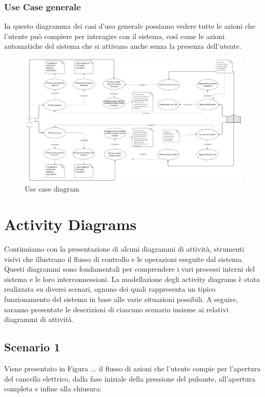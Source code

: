 \documentclass[12pt]{article}
\begin{document}
\newpage
\begin{landscape}
\subsubsection{Use Case generale}
In questo diagramma dei casi d'uso generale possiamo vedere tutte le azioni che l'utente può compiere per interagire con il sistema, così come le azioni automatiche del sistema che si attivano anche senza la presenza dell'utente.
\begin{figure}[H] %
    \centering %
    \includegraphics[width=1.4\textwidth]{usa_case_diagram.PNG} %
    \caption{Use case diagram} %
    \label{fig:General Use Case DIagram} %
\end{figure}
\end{landscape}

\newpage
\section{Activity Diagrams}
Continuiamo con la presentazione di alcuni diagrammi di attività, strumenti visivi che illustrano il flusso di controllo e le operazioni eseguite dal sistema. Questi diagrammi sono fondamentali per comprendere i vari processi interni del sistema e le loro interconnessioni.
La modellazione degli activity diagrams è stata realizzata su diversi scenari, ognuno dei quali rappresenta un tipico funzionamento del sistema in base alle varie situazioni possibili. A seguire, saranno presentate le descrizioni di ciascuno scenario insieme ai relativi diagrammi di attività.

\subsection{Scenario 1}
Viene presentato in Figura ... il flusso di azioni che l’utente compie per l’apertura del cancello elettrico, dalla fase iniziale della pressione del pulsante, all’apertura completa e infine alla chiusura:
\end{document}
